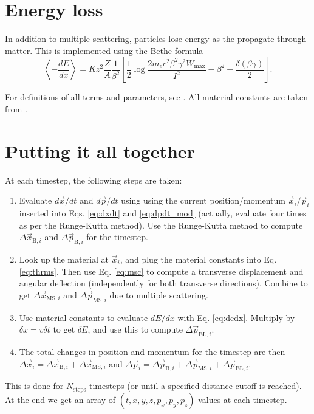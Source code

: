 \documentclass[12pt]{article}
\begin{document}
\section{Energy loss}
In addition to multiple scattering, particles lose energy as the propagate through matter. This is implemented using the 
Bethe formula
\begin{equation}\label{eq:dedx}
\left\langle-\frac{dE}{dx}\right\rangle = Kz^2\frac{Z}{A}\frac{1}{\beta^2}\left[\frac{1}{2}\log\frac{2m_ec^2\beta^2\gamma^2W_\text{max}}{I^2} - \beta^2 - \frac{\delta(\beta\gamma)}{2} \right].
\end{equation}

For definitions of all terms and parameters, see \cite{PDG_matter}. All material constants are taken from \cite{PDG_properties}.

\section{Putting it all together}
At each timestep, the following steps are taken:
\begin{enumerate}
\item Evaluate $d\vec{x}/dt$ and $d\vec{p}/dt$ using using the current position/momentum $\vec{x}_i/\vec{p}_i$ inserted into Eqs. \ref{eq:dxdt} and \ref{eq:dpdt_mod} (actually,
evaluate four times as per the Runge-Kutta method). Use the Runge-Kutta method to compute $\Delta\vec{x}_{\text{B},i}$ and $\Delta\vec{p}_{\text{B},i}$ for the timestep.
\item Look up the material at $\vec{x}_i$, and plug the material constants into Eq. \ref{eq:thrms}. Then use Eq. \ref{eq:msc} to compute a transverse displacement
and angular deflection (independently for both transverse directions). Combine to get $\Delta\vec{x}_{\text{MS},i}$ and $\Delta\vec{p}_{\text{MS},i}$ due to multiple scattering.
\item Use material constants to evaluate $dE/dx$ with Eq. \ref{eq:dedx}. Multiply by $\delta x=v\delta t$ to get $\delta E$, and use this to compute $\Delta\vec{p}_{\text{EL},i}$.
\item The total changes in position and momentum for the timestep are then $\Delta\vec{x}_i = \Delta\vec{x}_{\text{B},i}+\Delta\vec{x}_{\text{MS},i}$ and
$\Delta\vec{p}_i = \Delta\vec{p}_{\text{B},i}+\Delta\vec{p}_{\text{MS},i}+\Delta\vec{p}_{\text{EL},i}$.
\end{enumerate}

This is done for $N_\text{steps}$ timesteps (or until a specified distance cutoff is reached). At the end we get an array of $(t,x,y,z,p_x,p_y,p_z)$ values at each timestep.
\end{document}
